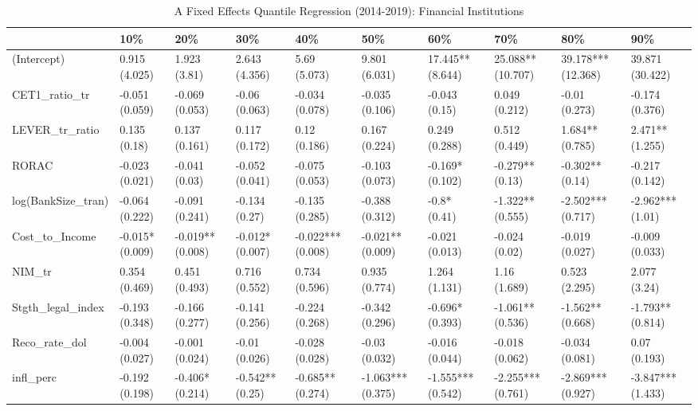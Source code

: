 \begin{table}[ht]
\centering
\caption{A Fixed Effects Quantile Regression (2014-2019): Financial Institutions} 
\begingroup\small
\begin{tabular}{llllllllll}
  \toprule
 & 10\% & 20\% & 30\% & 40\% & 50\% & 60\% & 70\% & 80\% & 90\% \\ 
  \midrule
(Intercept) & 0.915 (4.025) & 1.923 (3.81) & 2.643 (4.356) & 5.69 (5.073) & 9.801 (6.031) & 17.445** (8.644) & 25.088** (10.707) & 39.178*** (12.368) & 39.871 (30.422) \\ 
  CET1\_ratio\_tr & -0.051 (0.059) & -0.069 (0.053) & -0.06 (0.063) & -0.034 (0.078) & -0.035 (0.106) & -0.043 (0.15) & 0.049 (0.212) & -0.01 (0.273) & -0.174 (0.376) \\ 
  LEVER\_tr\_ratio & 0.135 (0.18) & 0.137 (0.161) & 0.117 (0.172) & 0.12 (0.186) & 0.167 (0.224) & 0.249 (0.288) & 0.512 (0.449) & 1.684** (0.785) & 2.471** (1.255) \\ 
  RORAC & -0.023 (0.021) & -0.041 (0.03) & -0.052 (0.041) & -0.075 (0.053) & -0.103 (0.073) & -0.169* (0.102) & -0.279** (0.13) & -0.302** (0.14) & -0.217 (0.142) \\ 
  log(BankSize\_tran) & -0.064 (0.222) & -0.091 (0.241) & -0.134 (0.27) & -0.135 (0.285) & -0.388 (0.312) & -0.8* (0.41) & -1.322** (0.555) & -2.502*** (0.717) & -2.962*** (1.01) \\ 
  Cost\_to\_Income & -0.015* (0.009) & -0.019** (0.008) & -0.012* (0.007) & -0.022*** (0.008) & -0.021** (0.009) & -0.021 (0.013) & -0.024 (0.02) & -0.019 (0.027) & -0.009 (0.033) \\ 
  NIM\_tr & 0.354 (0.469) & 0.451 (0.493) & 0.716 (0.552) & 0.734 (0.596) & 0.935 (0.774) & 1.264 (1.131) & 1.16 (1.689) & 0.523 (2.295) & 2.077 (3.24) \\ 
  Stgth\_legal\_index & -0.193 (0.348) & -0.166 (0.277) & -0.141 (0.256) & -0.224 (0.268) & -0.342 (0.296) & -0.696* (0.393) & -1.061** (0.536) & -1.562** (0.668) & -1.793** (0.814) \\ 
  Reco\_rate\_dol & -0.004 (0.027) & -0.001 (0.024) & -0.01 (0.026) & -0.028 (0.028) & -0.03 (0.032) & -0.016 (0.044) & -0.018 (0.062) & -0.034 (0.081) & 0.07 (0.193) \\ 
  infl\_perc & -0.192 (0.198) & -0.406* (0.214) & -0.542** (0.25) & -0.685** (0.274) & -1.063*** (0.375) & -1.555*** (0.542) & -2.255*** (0.761) & -2.869*** (0.927) & -3.847*** (1.433) \\ 

\end{tabular}
\end{table}

